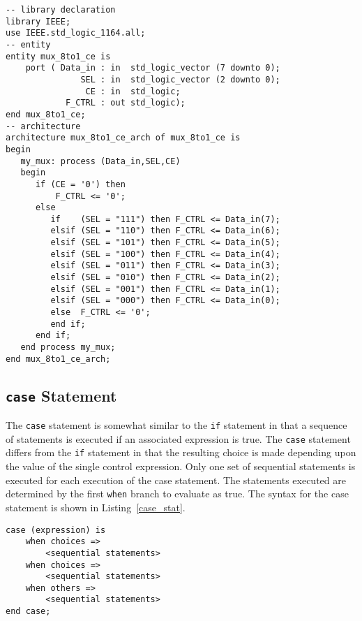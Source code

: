 \noindent
\begin{minipage}{0.99\linewidth}
\begin{lstlisting}[label=exe_11, caption=Solution to Example~11.]
-- library declaration
library IEEE;
use IEEE.std_logic_1164.all;
-- entity
entity mux_8to1_ce is
    port ( Data_in : in  std_logic_vector (7 downto 0);
               SEL : in  std_logic_vector (2 downto 0);
                CE : in  std_logic;
            F_CTRL : out std_logic);
end mux_8to1_ce;
-- architecture
architecture mux_8to1_ce_arch of mux_8to1_ce is
begin
   my_mux: process (Data_in,SEL,CE)
   begin
      if (CE = '0') then
          F_CTRL <= '0';
      else
         if    (SEL = "111") then F_CTRL <= Data_in(7);
         elsif (SEL = "110") then F_CTRL <= Data_in(6);
         elsif (SEL = "101") then F_CTRL <= Data_in(5);
         elsif (SEL = "100") then F_CTRL <= Data_in(4);
         elsif (SEL = "011") then F_CTRL <= Data_in(3);
         elsif (SEL = "010") then F_CTRL <= Data_in(2);
         elsif (SEL = "001") then F_CTRL <= Data_in(1);
         elsif (SEL = "000") then F_CTRL <= Data_in(0);
         else  F_CTRL <= '0';
         end if;
      end if;
   end process my_mux;
end mux_8to1_ce_arch;
\end{lstlisting}
\end{minipage}

\subsection{\texttt{case} Statement}
The \texttt{case} statement is somewhat similar to the \texttt{if} statement in that a sequence of statements is executed if an associated expression is true. The \texttt{case} statement differs from the \texttt{if} statement in that the resulting choice is made depending upon the value of the single control expression. Only one set of sequential statements is executed for each execution of the case statement. The statements executed are determined by the first \texttt{when} branch to evaluate as true. The syntax for the case statement is shown in Listing~\ref{case_stat}.

\noindent
\begin{minipage}{0.99\linewidth}
\begin{lstlisting}[label=case_stat, caption=Syntax for the \textit{case} statement.]
case (expression) is
	when choices =>
		<sequential statements>
	when choices =>
		<sequential statements>
	when others =>
		<sequential statements>
end case;
\end{lstlisting}
\end{minipage}

